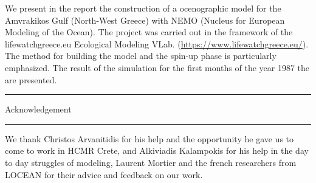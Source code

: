 \documentclass[english]{PFeENSTA}
\begin{document}
We present in the report the construction of a ocenographic model for the Amvrakikos Gulf (North-West Greece) with NEMO (Nucleus for European Modeling of the Ocean). The project was carried out in the framework of the lifewatchgreece.eu  Ecological Modeling VLab. (\url{https://www.lifewatchgreece.eu/}).
The method for building the model and the spin-up phase is particularly emphasized. The result of the simulation for the first months of the year 1987 the are presented. 


\vspace{1.5cm}
\hrule\vspace{0.5pt}
{\scshape\bfseries\Huge \begin{center}Acknowledgement\end{center}}
\vspace{0.5pt}\hrule\vspace{1.5cm}


We thank Christos Arvanitidis for his help and the opportunity he gave us to come to work in HCMR Crete, and Alkiviadis Kalampokis for his help in the day to day struggles of modeling, Laurent Mortier and the french researchers from LOCEAN for their advice and feedback on our work.


\tableofcontents
{}

\end{document}
